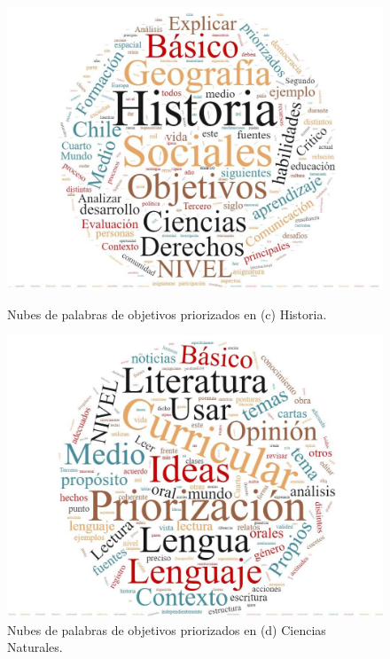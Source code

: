 \documentclass[spanish]{textolivre}
\begin{document}
\begin{figure}[htbp]
 \centering
 \begin{minipage}{.45\textwidth}
 \includegraphics[width=\textwidth]{fig-002c.jpeg.jpg}
 \caption{Nubes de palabras de objetivos priorizados en (c) Historia.}
 \label{fig2c}
 \end{minipage}%
 \qquad
 \begin{minipage}{0.45\textwidth}
 \includegraphics[width=\textwidth]{fig-002b.jpeg.jpg}
 \caption{Nubes de palabras de objetivos priorizados en (d) Ciencias Naturales.}
 \label{fig2d}
 \end{minipage}%
\end{figure}
\end{document}
